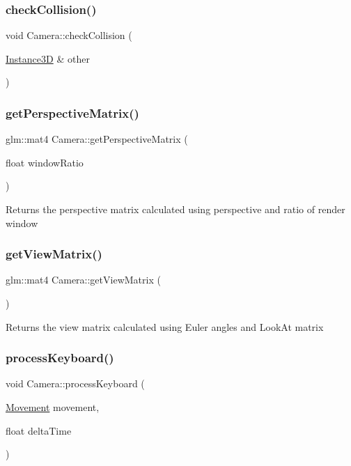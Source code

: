 \subsubsection{\texorpdfstring{check\+Collision()}{checkCollision()}}
{\footnotesize\ttfamily void Camera\+::check\+Collision (\begin{DoxyParamCaption}\item[{\hyperlink{classInstance3D}{Instance3D} \&}]{other }\end{DoxyParamCaption})}

\mbox{\label{classCamera_af0fb989c3e781583495e50bd9f04db03}} 
\subsubsection{\texorpdfstring{get\+Perspective\+Matrix()}{getPerspectiveMatrix()}}
{\footnotesize\ttfamily glm\+::mat4 Camera\+::get\+Perspective\+Matrix (\begin{DoxyParamCaption}\item[{float}]{window\+Ratio }\end{DoxyParamCaption})}

Returns the perspective matrix calculated using perspective and ratio of render window \mbox{\label{classCamera_a5569ca5967e01d3344fbf6aba36d9820}} 
\subsubsection{\texorpdfstring{get\+View\+Matrix()}{getViewMatrix()}}
{\footnotesize\ttfamily glm\+::mat4 Camera\+::get\+View\+Matrix (\begin{DoxyParamCaption}{ }\end{DoxyParamCaption})}

Returns the view matrix calculated using Euler angles and Look\+At matrix \mbox{\label{classCamera_a146e9154e8593faefeb4e23a7d3d21b6}} 
\subsubsection{\texorpdfstring{process\+Keyboard()}{processKeyboard()}}
{\footnotesize\ttfamily void Camera\+::process\+Keyboard (\begin{DoxyParamCaption}\item[{\hyperlink{camera_8h_a2fc3593b03b2993ef34f3900f6be985e}{Movement}}]{movement,  }\item[{float}]{delta\+Time }\end{DoxyParamCaption})}



